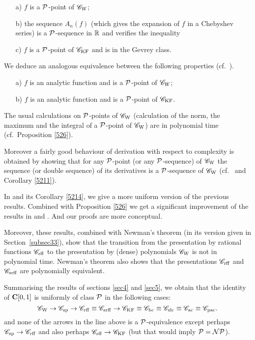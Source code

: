 \begin{itemize}

\item [a)]
$f$ is a ${\cal P}$-point of ${{{\mathscr C}}_{\rm W}}$;

\item [b)]
the sequence $A_n(f)$ (which gives the expansion of $f$ in a Chebyshev series) is a ${\cal P}$-sequence in $\mathbb {R}$ and verifies the inequality 


\item [c)] 
$f$ is a ${\cal P}$-point of ${{{\mathscr C}}_{\rm KF}}$ and is in the Gevrey class. 
\end{itemize}
We deduce an analogous equivalence between the following properties (cf.\ ).
\begin{itemize}

\item [a)] 
$f$ is an analytic function and is a ${\cal P}$-point of ${{{\mathscr C}}_{\rm W}}$;

\item [b)] 
$f$ is an analytic function and is a ${\cal P}$-point of ${{{\mathscr C}}_{\rm KF}}$.
\end{itemize}

 
The usual calculations on ${\cal P}$-points of ${{{\mathscr C}}_{\rm W}}$ (calculation of the norm, the maximum and the integral of a ${\cal P}$-point of ${{{\mathscr C}}_{\rm W}}$) are in polynomial time (cf.\ Proposition \ref{526}). 

Moreover a fairly good behaviour of  derivation with respect to complexity is obtained by showing that for any ${\cal P}$-point (or any ${\cal P}$-sequence) of ${{{\mathscr C}}_{\rm W}}$ the sequence (or double sequence) of its derivatives is a ${\cal P}$-sequence of ${{{\mathscr C}}_{\rm W}}$ (cf.\  and Corollary \ref{5211}).

\smallskip In  and its Corollary \ref{5214}, we give a more uniform version of the previous results. Combined with Proposition \ref{526}
we get a significant improvement of the results in \cite{Mu87} and \cite{KF88}. And our proofs are more conceptual. 

\smallskip Moreover, these results, combined with Newman's theorem (in its version given in Section~\ref{subsec33}), show that the transition from the presentation by rational functions ${{{\mathscr C}}_{\rm rff}}$ to the presentation by (dense) polynomials ${{{\mathscr C}}_{\rm W}}$ is not in polynomial time. 
Newman's theorem also shows that the presentations ${{{\mathscr C}}_{\rm rff}}$ and ${{{\mathscr C}}_{\rm srff}}$ are polynomially equivalent. 


\bigskip Summarising the results of sections \ref{sec4} and \ref{sec5}, we obtain that the identity of ${{\bf C}[0,1]}$ is uniformly of class ${\cal P}$ in the following cases: 
\[
{{{\mathscr C}}_{\rm W}} \rightarrow {{{\mathscr C}}_{\rm sp}} \rightarrow {{{\mathscr C}}_{\rm rff}} \equiv {{{\mathscr C}}_{\rm srff}} 
\rightarrow {{{\mathscr C}}_{\rm KF}} \equiv {{{\mathscr C}}_{\rm bc}} \equiv {{{\mathscr C}}_{\rm slc}} \equiv {{{\mathscr C}}_{\rm ac}} 
\equiv {{{\mathscr C}}_{\rm pac}}.
\] 
and none of the arrows in the line above is a ${\cal P}$-equivalence except perhaps ${{{\mathscr C}}_{\rm sp}} \to {{{\mathscr C}}_{\rm rff}}$ and also perhaps ${{{\mathscr C}}_{\rm rff}} \to {{{\mathscr C}}_{\rm KF}}$ (but that would imply ${\cal P} = {\cal NP}$).
 

